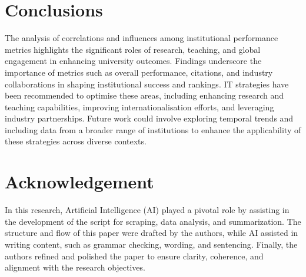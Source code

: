 \documentclass[conference]{IEEEtran}
\begin{document}
\section{Conclusions}

The analysis of correlations and influences among institutional performance metrics highlights the significant roles of research, teaching, and global engagement in enhancing university outcomes. Findings underscore the importance of metrics such as overall performance, citations, and industry collaborations in shaping institutional success and rankings. IT strategies have been recommended to optimise these areas, including enhancing research and teaching capabilities, improving internationalisation efforts, and leveraging industry partnerships. Future work could involve exploring temporal trends and including data from a broader range of institutions to enhance the applicability of these strategies across diverse contexts.


\section*{Acknowledgement}

In this research, Artificial Intelligence (AI) played a pivotal role by assisting in the development of the script for scraping, data analysis, and summarization. The structure and flow of this paper were drafted by the authors, while AI assisted in writing content, such as grammar checking, wording, and sentencing. Finally, the authors refined and polished the paper to ensure clarity, coherence, and alignment with the research objectives.



\end{document}
